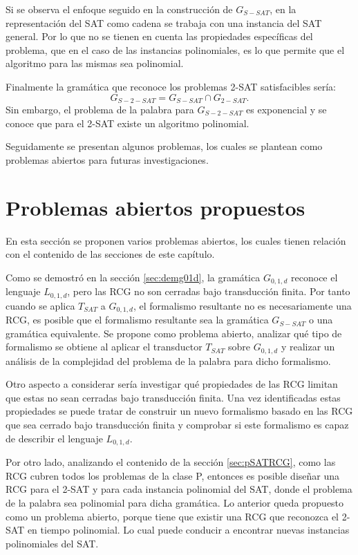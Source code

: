 Si se observa el enfoque seguido en la construcción de $G_{S-SAT}$, en la representación del SAT como cadena se trabaja con una instancia del SAT general. Por lo que no se tienen en cuenta las propiedades específicas del problema, que en el caso de las instancias polinomiales, es lo que permite que el algoritmo para las mismas sea polinomial.

Finalmente la gramática que reconoce los problemas 2-SAT satisfacibles sería:
$$G_{S-2-SAT}=G_{S-SAT}\cap G_{2-SAT}.$$
Sin embargo, el problema de la palabra para $G_{S-2-SAT}$ es exponencial y se conoce que para el 2-SAT existe un algoritmo polinomial.

Seguidamente se presentan algunos problemas, los cuales se plantean como problemas abiertos para futuras investigaciones.

\section{Problemas abiertos propuestos}

En esta sección se proponen varios problemas abiertos, los cuales tienen relación con el contenido de las secciones
de este capítulo.

Como se demostró en la sección \ref{sec:demg01d}, la gramática $G_{0,1,d}$ reconoce el lenguaje $L_{0,1,d}$, pero las RCG
no son cerradas bajo transducción finita. Por tanto cuando se aplica $T_{SAT}$ a $G_{0,1,d}$, el formalismo resultante 
no es necesariamente una RCG, es posible que el formalismo resultante sea la gramática $G_{S-SAT}$ o una gramática
equivalente. Se propone como problema abierto, analizar qué tipo de formalismo se obtiene al aplicar el transductor $T_{SAT}$
sobre $G_{0,1,d}$ y realizar un análisis de la complejidad del problema de la palabra para dicho formalismo. 

Otro aspecto a considerar sería investigar qué propiedades de las RCG limitan que estas no sean cerradas bajo transducción finita. 
Una vez identificadas estas propiedades se puede tratar de construir un nuevo formalismo basado en las RCG que sea cerrado bajo transducción finita y comprobar si este formalismo es capaz de describir el lenguaje $L_{0,1,d}$.

Por otro lado, analizando el contenido de la sección \ref{sec:pSATRCG}, como las RCG cubren todos los problemas de la clase P, entonces es posible diseñar una RCG para el 2-SAT y para cada instancia polinomial del SAT, donde el problema de la palabra sea polinomial para dicha gramática.
Lo anterior queda propuesto como un problema abierto, porque tiene que existir una RCG que reconozca el 2-SAT en tiempo polinomial.
Lo cual puede conducir a encontrar nuevas instancias polinomiales del SAT.


